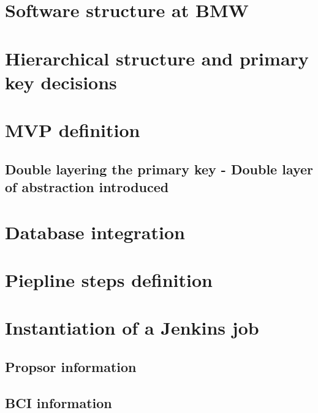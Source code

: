 \documentclass[../main.tex]{subfiles}
\begin{document}
\section{Software structure at \gls{BMW}}
\section{Hierarchical structure and primary key decisions}
\section{MVP definition}
\subsection{Double layering the primary key - Double layer of abstraction introduced}
\section{Database integration}
\section{Piepline steps definition}
\section{Instantiation of a Jenkins job}
\subsection{Propsor information}
\subsection{BCI information}
\cleardoublepage
\end{document}
